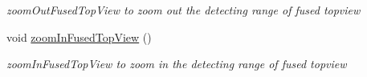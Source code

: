 \begin{DoxyCompactItemize}
\begin{DoxyCompactList}\small\item\em zoom\+Out\+Fused\+Top\+View to zoom out the detecting range of fused topview \end{DoxyCompactList}\item 
\hypertarget{class_sensor_info_a1bf4f300f920de29385b5747e1e5759f}{}void \hyperlink{class_sensor_info_a1bf4f300f920de29385b5747e1e5759f}{zoom\+In\+Fused\+Top\+View} ()\label{class_sensor_info_a1bf4f300f920de29385b5747e1e5759f}

\begin{DoxyCompactList}\small\item\em zoom\+In\+Fused\+Top\+View to zoom in the detecting range of fused topview \end{DoxyCompactList}\end{DoxyCompactItemize}
